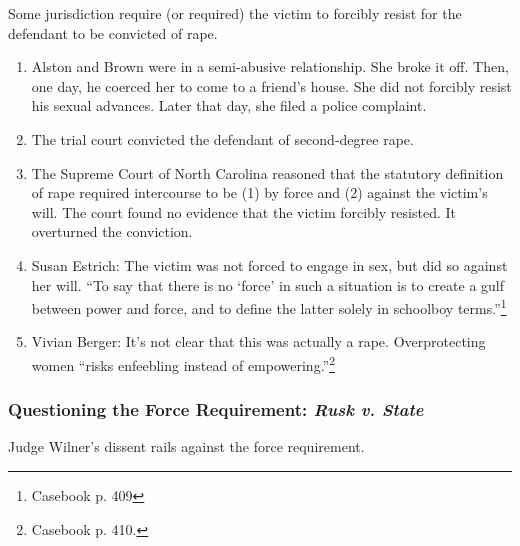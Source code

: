 Some jurisdiction require (or required) the victim to forcibly resist for the 
defendant to be convicted of rape.

\begin{enumerate}
    \item Alston and Brown were in a semi-abusive relationship. She broke it 
    off. Then, one day, he coerced her to come to a friend's house. She did 
    not forcibly resist his sexual advances. Later that day, she filed a 
    police complaint.
    \item The trial court convicted the defendant of second-degree rape.
    \item The Supreme Court of North Carolina reasoned that the statutory 
    definition of rape required intercourse to be (1) by force and (2) against 
    the victim's will. The court found no evidence that the victim forcibly 
    resisted. It overturned the conviction.
    \item Susan Estrich: The victim was not forced to engage in sex, but did 
    so against her will. ``To say that there is no `force' in such a situation 
    is to create a gulf between power and force, and to define the latter 
    solely in schoolboy terms.''\footnote{Casebook p. 409}
    \item Vivian Berger: It's not clear that this was actually a rape.  
    Overprotecting women ``risks enfeebling instead of 
    empowering.''\footnote{Casebook p. 410.}
\end{enumerate}

\subsubsection{Questioning the Force Requirement: \emph{Rusk v. State}}

Judge Wilner's dissent rails against the force requirement.

